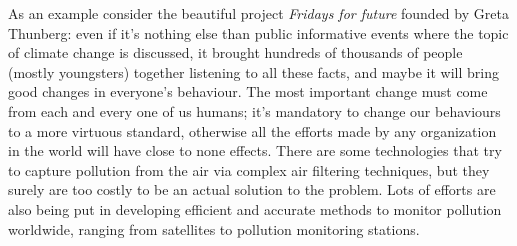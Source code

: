\documentclass[11pt,a4paper,titlepage]{book}
\begin{document}
As an example consider the beautiful project \textit{Fridays for future} founded by Greta Thunberg: even if it's nothing else than public informative events where the topic of climate change is discussed, it brought hundreds of thousands of people (mostly youngsters) together listening to all these facts, and maybe it will bring good changes in everyone's behaviour.
\newline
\newline
The most important change must come from each and every one of us humans; it's mandatory to change our behaviours to a more virtuous standard, otherwise all the efforts made by any organization in the world will have close to none effects.
\newline
There are some technologies that try to capture pollution from the air via complex air filtering techniques, but they surely are too costly to be an actual solution to the problem. Lots of efforts are also being put in developing efficient and accurate methods to monitor pollution worldwide, ranging from satellites to pollution monitoring stations.
\end{document}
